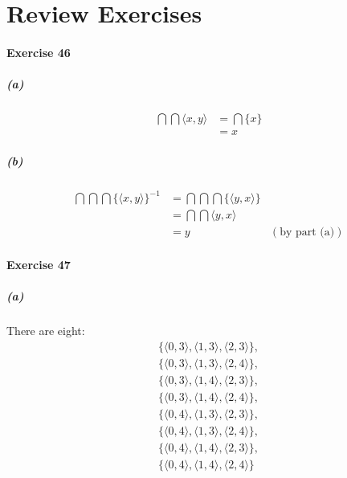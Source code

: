 \documentclass{report}
\begin{document}
    \section{Review Exercises}

    \paragraph{Exercise 46}
    \subparagraph{(a)}
    \begin{align*}
        \bigcap \bigcap \langle x,y \rangle & = \bigcap \{ x \} \\
        & = x
    \end{align*}

    \subparagraph{(b)}
    \begin{align*}
        \bigcap \bigcap \bigcap \{ \langle x,y \rangle \}^{-1}
        & = \bigcap \bigcap \bigcap \{ \langle y,x \rangle \} \\
        & = \bigcap \bigcap \langle y,x \rangle \\
        & = y & (\text{by part (a)})
    \end{align*}

    \paragraph{Exercise 47}
    \subparagraph{(a)}
    There are eight:
    \begin{align*}
        \{ \langle 0, 3 \rangle, \langle 1, 3 \rangle, \langle 2, 3 \rangle \}, \\
        \{ \langle 0, 3 \rangle, \langle 1, 3 \rangle, \langle 2, 4 \rangle \}, \\
        \{ \langle 0, 3 \rangle, \langle 1, 4 \rangle, \langle 2, 3 \rangle \}, \\
        \{ \langle 0, 3 \rangle, \langle 1, 4 \rangle, \langle 2, 4 \rangle \}, \\
        \{ \langle 0, 4 \rangle, \langle 1, 3 \rangle, \langle 2, 3 \rangle \}, \\
        \{ \langle 0, 4 \rangle, \langle 1, 3 \rangle, \langle 2, 4 \rangle \}, \\
        \{ \langle 0, 4 \rangle, \langle 1, 4 \rangle, \langle 2, 3 \rangle \}, \\
        \{ \langle 0, 4 \rangle, \langle 1, 4 \rangle, \langle 2, 4 \rangle \}
    \end{align*}
\end{document}
